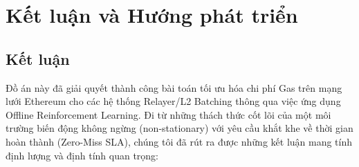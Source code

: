 \chapter*{Kết luận và Hướng phát triển}

\section*{Kết luận}

Đồ án này đã giải quyết thành công bài toán tối ưu hóa chi phí Gas trên mạng lưới Ethereum cho các hệ thống Relayer/L2 Batching thông qua việc ứng dụng Offline Reinforcement Learning. Đi từ những thách thức cốt lõi của một môi trường biến động không ngừng (non-stationary) với yêu cầu khắt khe về thời gian hoàn thành (Zero-Miss SLA), chúng tôi đã rút ra được những kết luận mang tính định lượng và định tính quan trọng:


